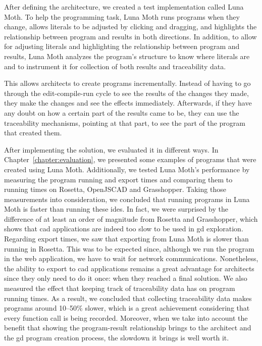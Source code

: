After defining the architecture, we created a test implementation called Luna Moth.
To help the programming task, Luna Moth runs programs when they change, allows literals to be adjusted by clicking and dragging, and highlights the relationship between program and results in both directions.
In addition, to allow for adjusting literals and highlighting the relationship between program and results, Luna Moth analyzes the program's structure to know where literals are and to instrument it for collection of both results and traceability data.

This allows architects to create programs incrementally.
Instead of having to go through the edit-compile-run cycle to see the results of the changes they made, they make the changes and see the effects immediately.
Afterwards, if they have any doubt on how a certain part of the results came to be, they can use the traceability mechanisms, pointing at that part, to see the part of the program that created them.

After implementing the solution, we evaluated it in different ways.
In Chapter~\ref{chapter:evaluation}, we presented some examples of programs that were created using Luna Moth.
Additionally, we tested Luna Moth's performance by measuring the program running and export times and comparing them to running times on Rosetta, OpenJSCAD and Grasshopper.
Taking those measurements into consideration, we concluded that running programs in Luna Moth is faster than running these \glspl{ide}.
In fact, we were surprised by the difference of at least an order of magnitude from Rosetta and Grasshopper, which shows that \gls{cad} applications are indeed too slow to be used in \gls{gd} exploration.
Regarding export times, we saw that exporting from Luna Moth is slower than running in Rosetta.
This was to be expected since, although we run the program in the web application, we have to wait for network communications.
Nonetheless, the ability to export to \gls{cad} applications remains a great advantage for architects since they only need to do it once: when they reached a final solution.
We also measured the effect that keeping track of traceability data has on program running times.
As a result, we concluded that collecting traceability data makes programs around 10--50\% slower, which is a great achievement considering that every function call is being recorded.
Moreover, when we take into account the benefit that showing the program-result relationship brings to the architect and the \gls{gd} program creation process, the slowdown it brings is well worth it.

